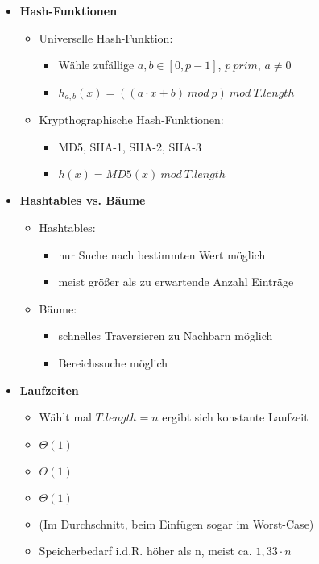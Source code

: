 \begin{itemize}
        \item \textbf{Hash-Funktionen}
            \begin{itemize}
                \item Universelle Hash-Funktion:
                    \begin{itemize}
                        \item Wähle zufällige $a,b \in [0, p - 1]$, $p~prim$, $a \neq 0$
                        \item $h_{a,b}(x)= ((a \cdot x + b)~mod~p)~mod~T.length$
                    \end{itemize}
                \item Krypthographische Hash-Funktionen:
                    \begin{itemize}
                        \item MD5, SHA-1, SHA-2, SHA-3
                        \item $h(x) = MD5(x)~mod~T.length$
                    \end{itemize}
            \end{itemize}

\pagebreak
        
        \item \textbf{Hashtables vs. Bäume}
            \begin{itemize}
                \item Hashtables:
                    \begin{itemize}
                        \item nur Suche nach bestimmten Wert möglich
                        \item meist größer als zu erwartende Anzahl Einträge
                    \end{itemize}
                \item Bäume:
                    \begin{itemize}
                        \item schnelles Traversieren zu Nachbarn möglich
                        \item Bereichssuche möglich
                    \end{itemize}
            \end{itemize}
        
        \item \textbf{Laufzeiten}
            \begin{itemize}
                \item Wählt mal $T.length = n$ ergibt sich konstante Laufzeit
                \item {} $\Theta(1)$
                \item {} $\Theta(1)$
                \item {} $\Theta(1)$
                \item (Im Durchschnitt, beim Einfügen sogar im Worst-Case)
                \item Speicherbedarf i.d.R. höher als n, meist ca. $1,33 \cdot n$
            \end{itemize}
    \end{itemize}

